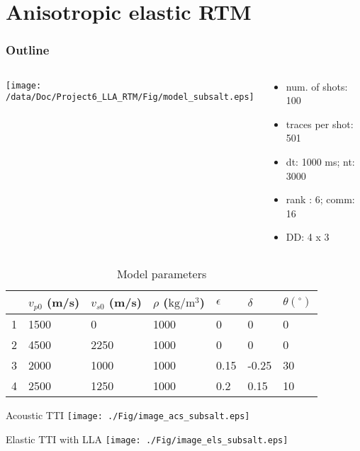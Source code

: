 \documentclass[aspectratio=43]{beamer}
\begin{document}
\section{Anisotropic elastic RTM}
\begin{frame}
\frametitle{Outline}
\tableofcontents[currentsection]
\end{frame}
\begin{frame}
\begin{columns}
  \begin{column}{0.6\textwidth}
  \texttt{[image: /data/Doc/Project6\_LLA\_RTM/Fig/model\_subsalt.eps]}
  \end{column}
  \begin{column}{0.4\textwidth}
\begin{itemize}
\item{num. of shots: 100}
\item{traces per shot: 501}
\item{dt: 1000 ms; nt: 3000}
\item{rank : 6; comm: 16}
\item{DD: 4 x 3}
\end{itemize}
  \end{column}
\end{columns}

\begin{table}[]
\centering
\begin{tabular}{|l|l|l|l|l|l|l|}
\hline
  &  $v_{p0}$ (m/s) & $v_{s0}$ (m/s) & $\rho$ ($\mathrm{kg/m^3}$) & $\epsilon$ & $\delta$  & $\theta(^\circ)$ \\ \hline
1 & 1500     & 0        & 1000        & 0    & 0     & 0    \\ \hline
2 & 4500     & 2250     & 1000        & 0    & 0     & 0    \\ \hline
3 & 2000     & 1000     & 1000        & 0.15 & -0.25 & 30   \\ \hline
4 & 2500     & 1250     & 1000        & 0.2  & 0.15  & 10   \\ \hline
\end{tabular}
\caption{Model parameters}
\end{table}
\end{frame}
\begin{frame}{Acoustic TTI}
\center
  \texttt{[image: ./Fig/image\_acs\_subsalt.eps]}
\end{frame}
\begin{frame}{Elastic TTI with LLA}
\center
  \texttt{[image: ./Fig/image\_els\_subsalt.eps]}
\end{frame}
\end{document}

